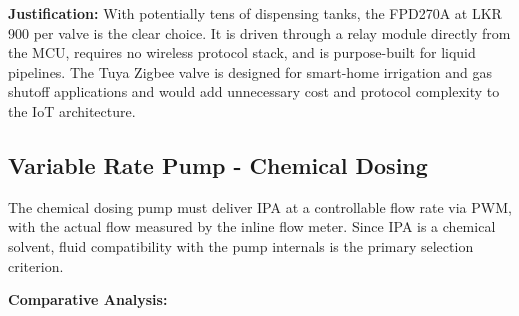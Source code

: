 \documentclass[12pt,a4paper]{article}
\begin{document}
\noindent\textbf{Justification:} With potentially tens of dispensing tanks, the FPD270A at LKR 900 per valve is the clear choice. It is driven through a relay module directly from the MCU, requires no wireless protocol stack, and is purpose-built for liquid pipelines. The Tuya Zigbee valve is designed for smart-home irrigation and gas shutoff applications and would add unnecessary cost and protocol complexity to the IoT architecture.

\newpage
\subsection{Variable Rate Pump - Chemical Dosing}

The chemical dosing pump must deliver IPA at a controllable flow rate via PWM, with the actual flow measured by the inline flow meter. Since IPA is a chemical solvent, fluid compatibility with the pump internals is the primary selection criterion.

\vspace{0.3cm}
\noindent\textbf{Comparative Analysis:}
\end{document}
